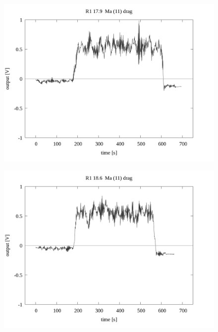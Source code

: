 \documentclass[a4paper]{jsarticle}
\begin{document}
\begin{figure}[htbp]
    \footnotesize
    \begin{center}
        \includegraphics[width=140mm]{../../../33_result/210806/moving_average/11/drag/01/R1_17.9_ma(11)_drag_01.png}
    \end{center}
\end{figure}

\begin{figure}[htbp]
    \footnotesize
    \begin{center}
        \includegraphics[width=140mm]{../../../33_result/210806/moving_average/11/drag/01/R1_18.6_ma(11)_drag_01.png}
    \end{center}
\end{figure}
\end{document}
